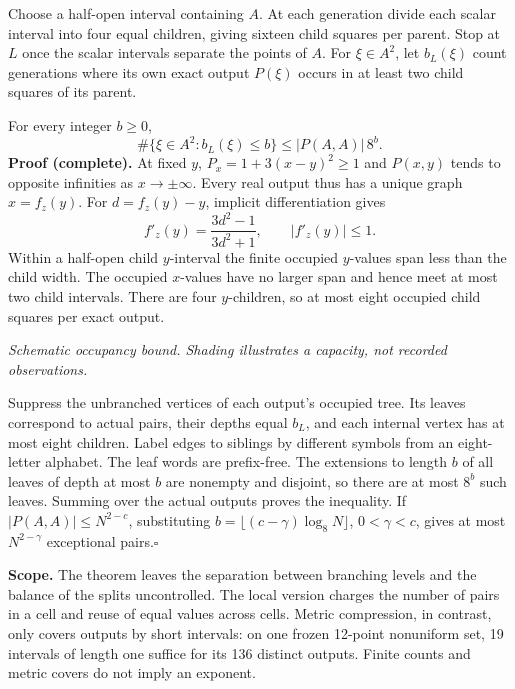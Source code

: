 Choose a half-open interval containing $A$. At each generation divide each scalar interval into four equal children, giving sixteen child squares per parent. Stop at $L$ once the scalar intervals separate the points of $A$. For $\xi\in A^2$, let $b_L(\xi)$ count generations where its own exact output $P(\xi)$ occurs in at least two child squares of its parent.

\quad For every integer $b\ge0$,
\[
   \#\{\xi\in A^2:b_L(\xi)\le b\}\le |P(A,A)|\,8^b.
\]
\textbf{Proof (complete).} At fixed $y$, $P_x=1+3(x-y)^2\ge1$ and $P(x,y)$ tends to opposite infinities as $x\to\pm\infty$. Every real output thus has a unique graph $x=f_z(y)$. For $d=f_z(y)-y$, implicit differentiation gives
\[
    f'_z(y)=\frac{3d^2-1}{3d^2+1},\qquad |f'_z(y)|\le1.
\]
Within a half-open child $y$-interval the finite occupied $y$-values span less than the child width. The occupied $x$-values have no larger span and hence meet at most two child intervals. There are four $y$-children, so at most eight occupied child squares per exact output.

\begin{center}\par{\footnotesize\itshape Schematic occupancy bound. Shading illustrates a capacity, not recorded observations.}\end{center}

Suppress the unbranched vertices of each output's occupied tree. Its leaves correspond to actual pairs, their depths equal $b_L$, and each internal vertex has at most eight children. Label edges to siblings by different symbols from an eight-letter alphabet. The leaf words are prefix-free. The extensions to length $b$ of all leaves of depth at most $b$ are nonempty and disjoint, so there are at most $8^b$ such leaves. Summing over the actual outputs proves the inequality. If $|P(A,A)|\le N^{2-c}$, substituting $b=\lfloor(c-\gamma)\log_8 N\rfloor$, $0<\gamma<c$, gives at most $N^{2-\gamma}$ exceptional pairs.\hfill$\square$

\textbf{Scope.} The theorem leaves the separation between branching levels and the balance of the splits uncontrolled. The local version charges the number of pairs in a cell and reuse of equal values across cells. Metric compression, in contrast, only covers outputs by short intervals: on one frozen 12-point nonuniform set, 19 intervals of length one suffice for its 136 distinct outputs. Finite counts and metric covers do not imply an exponent. 
